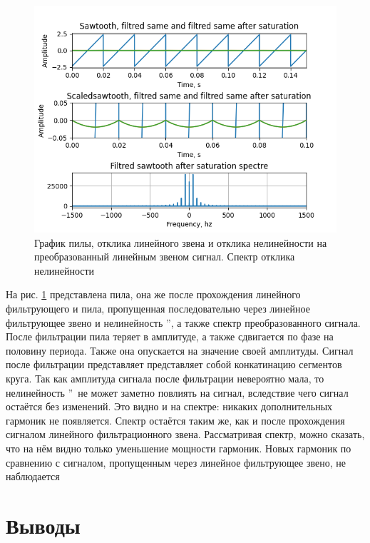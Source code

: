 \begin{figure}[H]
	\centering
	\includegraphics[width=1.05\linewidth]{body/images/filtred-sawtooth-after-saturation-and-its-spectre.png}
	\caption{График пилы, отклика линейного звена и отклика нелинейности на преобразованный
	линейным звеном сигнал. Спектр отклика нелинейности}
	\label{fig:39}
\end{figure}

На рис. \ref{fig:39} представлена пила, она же после прохождения
линейного фильтрующего и пила, пропущенная последовательно через линейное
фильтрующее звено и нелинейность \textquotedblright,
а также спектр преобразованного сигнала. После фильтрации пила теряет в амплитуде,
а также сдвигается по фазе на половину периода. Также она опускается на значение
своей амплитуды. Сигнал после фильтрации представляет представляет собой
конкатинацию сегментов круга. Так как амплитуда сигнала после фильтрации невероятно мала, то
нелинейность \textquotedblright\ не может заметно повлиять
на сигнал, вследствие чего сигнал остаётся без изменений. Это видно и на спектре:
никаких дополнительных гармоник не появляется. Спектр остаётся таким же, как и после
прохождения сигналом линейного фильтрационного звена. Рассматривая спектр, можно
сказать, что на нём видно только уменьшение мощности гармоник. Новых гармоник по
сравнению с сигналом, пропущенным через линейное фильтрующее звено, не наблюдается

\section{Выводы}

